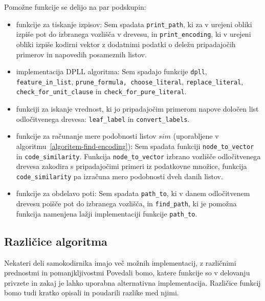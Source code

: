 \documentclass[12pt,a4paper,twoside]{article}
\theoremstyle{definition} %
\theoremstyle{plain} %
\numberwithin{equation}{section}  %
\begin{document}

Pomožne funkcije se delijo na par podskupin:
\begin{itemize}
	\item funkcije za tiskanje izpisov: Sem spadata \texttt{print\_path}, ki za v urejeni obliki izpiše pot do izbranega vozlišča v drevesu, in 
	\texttt{print\_encoding}, ki v urejeni obliki izpiše kodirni vektor z dodatnimi podatki o deležu pripadajočih primerov in napovedih posameznih listov.

	\item implementacija DPLL algoritma: Sem spadajo funkcije \texttt{dpll}, \texttt{feature\_\-in\_\-list}, \texttt{prune\_\-formula, choose\_\-literal}, 
	\texttt{replace\_\-literal}, \texttt{check\_\-for\_\-un\-it\_\-clause} in \texttt{check\_\-for\_\-pure\_\-literal}.
	
	\item funkciji za iskanje vrednost, ki jo pripadajočim primerom napove določen list odločitvenega drevesa: \texttt{leaf\_\-label} in \texttt{convert\_\-labels}.
	
	\item funkcije za računanje mere podobnosti listov $sim$ (uporabljene v algoritmu~\ref{algoritem-find-encoding}): 
	Sem spadata funkciji \texttt{node\_\-to\_\-vector} in \texttt{code\_\-similarity}.
	Funkcija \texttt{node\_\-to\_\-vector} izbrano vozlišče odločitvenega drevesa zakodira s pripadajočimi primeri iz podatkovne množice, %
	funkcija \texttt{code\_\-similarity} pa izračuna mero podobnosti dveh danih listov.
	
	\item funkcije za obdelavo poti: Sem spadata \texttt{path\_\-to}, ki v danem odločitvenem drevesu poišče pot do izbranega vozlišča, 
	in \texttt{find\_\-path}, ki je pomožna funkcija namenjena lažji implementaciji funkcije \texttt{path\_\-to}.
\end{itemize}


\subsection{Različice algoritma}

Nekateri deli samokodirnika imajo več možnih implementacij, z različnimi prednostmi in pomanjkljivostmi
Povedali bomo, katere funkcije so v delovanju privzete in zakaj je lahko uporabna alternativna implementacija.
Različice funkcij bomo tudi kratko opisali in poudarili razlike med njimi.
\end{document}
